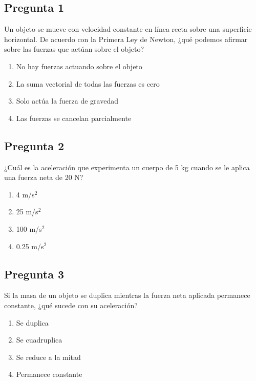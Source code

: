 \begin{preguntabox}
\subsection{Pregunta 1}
Un objeto se mueve con velocidad constante en línea recta sobre una superficie horizontal. De acuerdo con la Primera Ley de Newton, ¿qué podemos afirmar sobre las fuerzas que actúan sobre el objeto?

\begin{enumerate}
    \item[A)] No hay fuerzas actuando sobre el objeto
    \item[B)] La suma vectorial de todas las fuerzas es cero
    \item[C)] Solo actúa la fuerza de gravedad
    \item[D)] Las fuerzas se cancelan parcialmente
\end{enumerate}
\end{preguntabox}

\begin{preguntabox}
\subsection{Pregunta 2}
¿Cuál es la aceleración que experimenta un cuerpo de 5 kg cuando se le aplica una fuerza neta de 20 N?

\begin{enumerate}
    \item[A)] 4 m/s$^2$
    \item[B)] 25 m/s$^2$
    \item[C)] 100 m/s$^2$
    \item[D)] 0.25 m/s$^2$
\end{enumerate}
\end{preguntabox}

\begin{preguntabox}
\subsection{Pregunta 3}
Si la masa de un objeto se duplica mientras la fuerza neta aplicada permanece constante, ¿qué sucede con su aceleración?

\begin{enumerate}
    \item[A)] Se duplica
    \item[B)] Se cuadruplica
    \item[C)] Se reduce a la mitad
    \item[D)] Permanece constante
\end{enumerate}
\end{preguntabox}

